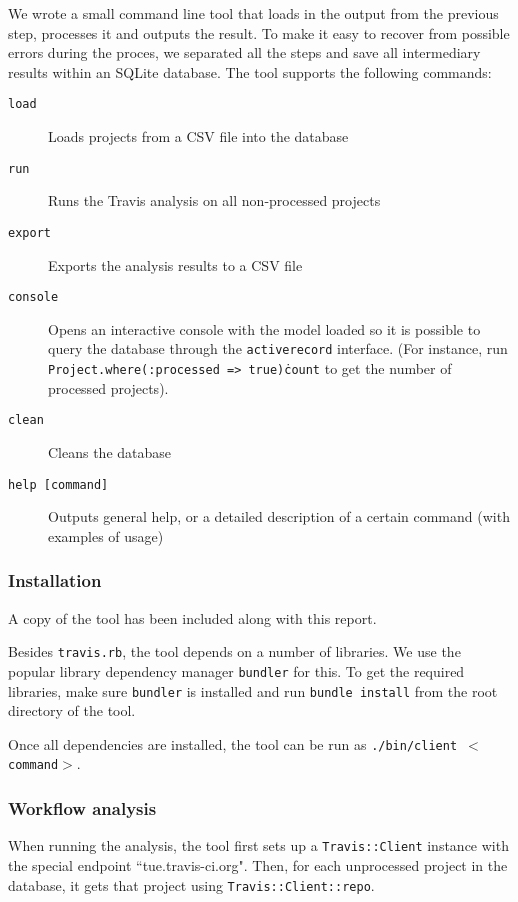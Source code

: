 We wrote a small command line tool that loads in the output from the previous step, processes it and outputs the result.
To make it easy to recover from possible errors during the proces, we separated all the steps and save all intermediary results within an SQLite database.
The tool supports the following commands:

\begin{description}
	\item[\texttt{load}] Loads projects from a CSV file into the database
	\item[\texttt{run}] Runs the Travis analysis on all non-processed projects
	\item[\texttt{export}] Exports the analysis results to a CSV file
	\item[\texttt{console}] Opens an interactive console with the model loaded so it is possible to query the database through the \texttt{activerecord} interface. (For instance, run \texttt{Project.\-where(:processed => true)\.count} to get the number of processed projects).
	\item[\texttt{clean}] Cleans the database
	\item[\texttt{help [command]}] Outputs general help, or a detailed description of a certain command (with examples of usage)
\end{description}

	\subsubsection{Installation}
	A copy of the tool has been included along with this report.
	
	Besides \texttt{travis.rb}, the tool depends on a number of libraries.
	We use the popular library dependency manager \texttt{bundler} for this.
	To get the required libraries, make sure \texttt{bundler} is installed and run \texttt{bundle install} from the root directory of the tool.
	
	Once all dependencies are installed, the tool can be run as \texttt{./bin/client $<$command$>$}.

	\subsubsection{Workflow analysis}
	When running the analysis, the tool first sets up a \texttt{Travis::Client} instance with the special endpoint ``tue.travis-ci.org".
	Then, for each unprocessed project in the database, it gets that project using \texttt{Travis::Client::repo}.
	
